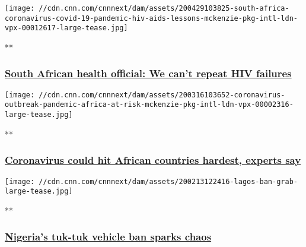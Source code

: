 \texttt{[image: //cdn.cnn.com/cnnnext/dam/assets/200429103825-south-africa-coronavirus-covid-19-pandemic-hiv-aids-lessons-mckenzie-pkg-intl-ldn-vpx-00012617-large-tease.jpg]}

**

\hypertarget{south-african-health-official-we-cant-repeat-hiv-failures}{%
\subsubsection{\texorpdfstring{\href{/videos/world/2020/04/29/south-africa-coronavirus-covid-19-pandemic-hiv-aids-lessons-mckenzie-pkg-intl-ldn-vpx.cnn}{South
African health official: We can't repeat HIV
failures}}{South African health official: We can't repeat HIV failures}}\label{south-african-health-official-we-cant-repeat-hiv-failures}}

\href{/videos/world/2020/03/16/coronavirus-outbreak-pandemic-africa-at-risk-mckenzie-pkg-intl-ldn-vpx.cnn}{}

\texttt{[image: //cdn.cnn.com/cnnnext/dam/assets/200316103652-coronavirus-outbreak-pandemic-africa-at-risk-mckenzie-pkg-intl-ldn-vpx-00002316-large-tease.jpg]}

**

\hypertarget{coronavirus-could-hit-african-countries-hardest-experts-say-}{%
\subsubsection{\texorpdfstring{\href{/videos/world/2020/03/16/coronavirus-outbreak-pandemic-africa-at-risk-mckenzie-pkg-intl-ldn-vpx.cnn}{Coronavirus
could hit African countries hardest, experts say
}}{Coronavirus could hit African countries hardest, experts say }}\label{coronavirus-could-hit-african-countries-hardest-experts-say-}}

\href{/videos/world/2020/02/13/lagos-nigeria-motorcycle-ban-busari-lkl-intl-ldn-vpx.cnn}{}

\texttt{[image: //cdn.cnn.com/cnnnext/dam/assets/200213122416-lagos-ban-grab-large-tease.jpg]}

**

\hypertarget{nigerias-tuk-tuk-vehicle-ban-sparks-chaos}{%
\subsubsection{\texorpdfstring{\href{/videos/world/2020/02/13/lagos-nigeria-motorcycle-ban-busari-lkl-intl-ldn-vpx.cnn}{Nigeria's
tuk-tuk vehicle ban sparks
chaos}}{Nigeria's tuk-tuk vehicle ban sparks chaos}}\label{nigerias-tuk-tuk-vehicle-ban-sparks-chaos}}

